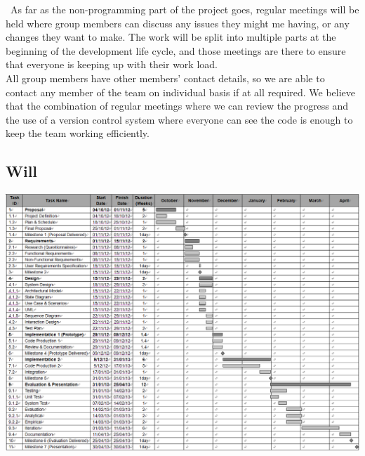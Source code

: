 \documentclass[10pt,a4paper,oneside]{report}
\begin{document}
\
As far as the non-programming part of the project goes, regular meetings will be held where group members can discuss any issues they might me having, or any changes they want to make. The work will be split into multiple parts at the beginning of the development life cycle, and those meetings are there to ensure that everyone is keeping up with their work load.\\

All group members have other members' contact details, so we are able to contact any member of the team on individual basis if at all required. We believe that the combination of regular meetings where we can review the progress and the use of a version control system where everyone can see the code is enough to keep the team working efficiently.

\begin{landscape}
\begin{center}
\hspace*{-1.5in}
\vspace*{-1.5in}
\section*{Will}
\includegraphics[height=\textheight,keepaspectratio]{gantt.jpg}
\end{center}
\end{landscape}
\end{document}
